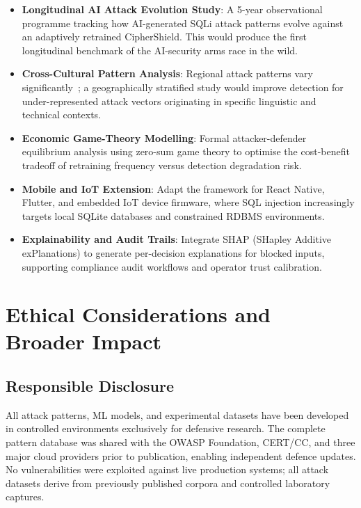\documentclass[10pt,twocolumn]{article}
\begin{document}
\begin{itemize}[leftmargin=*,itemsep=2pt,topsep=2pt]
  \item \textbf{Longitudinal AI Attack Evolution Study}: A 5-year
        observational programme tracking how AI-generated SQLi attack
        patterns evolve against an adaptively retrained CipherShield.
        This would produce the first longitudinal benchmark of the
        AI-security arms race in the wild.
  \item \textbf{Cross-Cultural Pattern Analysis}: Regional attack
        patterns vary significantly~\cite{verizon2024}; a
        geographically stratified study would improve detection for
        under-represented attack vectors originating in specific
        linguistic and technical contexts.
  \item \textbf{Economic Game-Theory Modelling}: Formal
        attacker-defender equilibrium analysis using zero-sum game
        theory to optimise the cost-benefit tradeoff of retraining
        frequency versus detection degradation risk.
  \item \textbf{Mobile and IoT Extension}: Adapt the framework for
        React Native, Flutter, and embedded IoT device firmware,
        where SQL injection increasingly targets local SQLite
        databases and constrained RDBMS environments.
  \item \textbf{Explainability and Audit Trails}: Integrate SHAP
        (SHapley Additive exPlanations) to generate per-decision
        explanations for blocked inputs, supporting compliance audit
        workflows and operator trust calibration.
\end{itemize}

\section{Ethical Considerations and Broader Impact}
\label{sec:ethics}

\subsection{Responsible Disclosure}

All attack patterns, ML models, and experimental datasets have been
developed in controlled environments exclusively for defensive research.
The complete pattern database was shared with the OWASP Foundation,
CERT/CC, and three major cloud providers prior to publication, enabling
independent defence updates. No vulnerabilities were exploited against
live production systems; all attack datasets derive from previously
published corpora and controlled laboratory captures.
\end{document}
